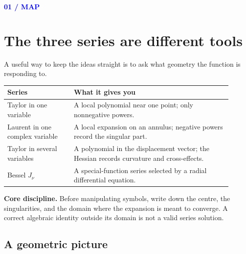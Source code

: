 \documentclass[11pt]{article}
\newcommand{\sectiontag}[1]{\textcolor{blue}{\sffamily\footnotesize\bfseries #1}\par\vspace{2pt}}
\begin{document}
\sectiontag{01 / MAP}\section*{The three series are different tools}
A useful way to keep the ideas straight is to ask what geometry the function is responding to.
\begin{center}
\begin{tabular}{>{\raggedright\arraybackslash}p{0.27\linewidth} p{0.64\linewidth}}
\toprule
\textbf{Series} & \textbf{What it gives you}\\\midrule
Taylor in one variable & A local polynomial near one point; only nonnegative powers.\\
Laurent in one complex variable & A local expansion on an annulus; negative powers record the singular part.\\
Taylor in several variables & A polynomial in the displacement vector; the Hessian records curvature and cross-effects.\\
Bessel $J_\nu$ & A special-function series selected by a radial differential equation.\\
\bottomrule
\end{tabular}
\end{center}
\vspace{4mm}
\begin{bluebox}\textbf{Core discipline.} Before manipulating symbols, write down the centre, the singularities, and the domain where the expansion is meant to converge. A correct algebraic identity outside its domain is not a valid series solution.\end{bluebox}
\subsection*{A geometric picture}
\begin{center}
\end{center}
\end{document}

